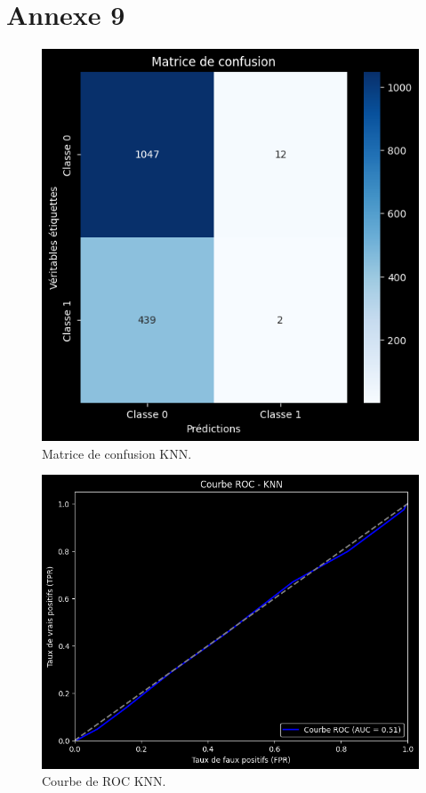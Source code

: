 \section*{Annexe 9}
\label{sec:annexe9}
\begin{figure}[H]
\centering
\includegraphics[width=1\textwidth]{figures/MatriceKNN.png}
\caption{Matrice de confusion KNN.}
\label{fig:annexe9}
\end{figure}


\begin{figure}[H]
\centering
\includegraphics[width=1\textwidth]{figures/ROCKNN.png}
\caption{Courbe de ROC KNN.}
\end{figure}
